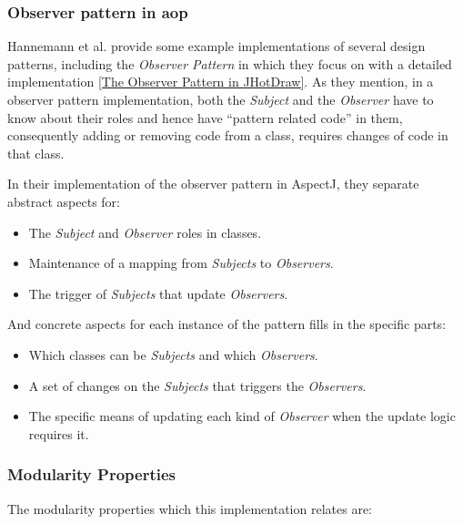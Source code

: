 \subsubsection{Observer pattern in \acrlong{aop}}\label{Observer pattern in Aspect Oriented Programming}
Hannemann et al. \cite{hannemann2002design} provide some example implementations of several design patterns, including the \textit{Observer Pattern} in which they focus on with a detailed implementation \ref{The Observer Pattern in JHotDraw}.
As they mention, in a observer pattern implementation, both the \textit{Subject} and the \textit{Observer} have to know about their roles and hence have ``pattern related code'' in them, consequently adding or removing code from a class, requires changes of code in that class. 

In their implementation \cite{hannemann2002design} of the observer pattern in AspectJ, they separate abstract aspects for: 

\begin{itemize}
	\item The \textit{Subject} and \textit{Observer} roles in classes.

	\item Maintenance of a mapping from \textit{Subjects} to \textit{Observers}.

	\item The trigger of \textit{Subjects} that update \textit{Observers}.
\end{itemize}

And concrete aspects for each instance of the pattern fills in the specific parts:
\begin{itemize}
	\item Which classes can be \textit{Subjects} and which \textit{Observers}.

	\item A set of changes on the \textit{Subjects} that triggers the \textit{Observers}.

	\item The specific means of updating each kind of \textit{Observer} when the update logic requires it.
\end{itemize}

\subsubsection{Modularity Properties}\label{Modularity Properties}
The modularity properties which this implementation relates are\cite{hannemann2002design}:

